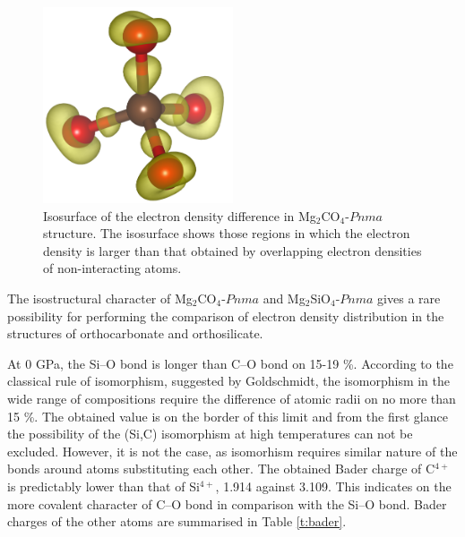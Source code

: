 \documentclass[a4paperm]{article}
\begin{document}
\begin{figure}[H]
	\includegraphics[width=0.5\textwidth]{dens_diff.png} \centering
	\caption{Isosurface of the electron density difference in Mg$_2$CO$_4$-$Pnma$ structure. The isosurface shows those regions in which the electron density is larger than that obtained by overlapping electron densities of non-interacting atoms.} \label{diff}
\end{figure}

The isostructural character of Mg$_2$CO$_4$-$Pnma$ and Mg$_2$SiO$_4$-$Pnma$ gives a rare possibility for performing the comparison of electron density distribution in the structures of orthocarbonate and orthosilicate.

At 0 GPa, the Si--O bond is longer than C--O bond on 15-19 \%.
According to the classical rule of isomorphism, suggested by Goldschmidt, the isomorphism in the wide range of compositions require the difference of atomic radii on no more than 15 \%.
The obtained value is on the border of this limit and from the first glance the possibility of the (Si,C) isomorphism at high temperatures can not be excluded.
However, it is not the case, as isomorhism requires similar nature of the bonds around atoms substituting each other.
The obtained Bader charge of C$^{4+}$ is predictably lower than that of Si$^{4+}$, 1.914 against 3.109. 
This indicates on the more covalent character of C--O bond in comparison with the Si--O bond.
Bader charges of the other atoms are summarised in Table \ref{t:bader}.
\end{document}
